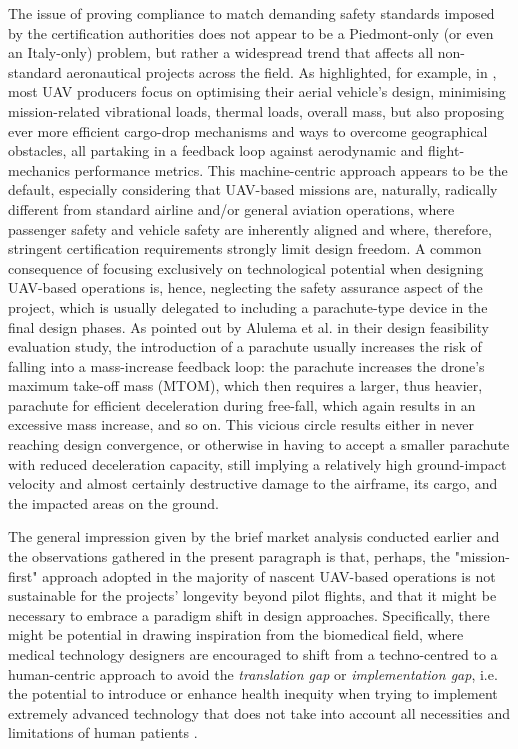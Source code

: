 The issue of proving compliance to match demanding safety standards imposed by the certification authorities does not appear to be a Piedmont-only (or even an Italy-only) problem, but rather a widespread trend that affects all non-standard aeronautical projects across the field. As highlighted, for example, in \cite{chhetri2026survey}, most UAV producers focus on optimising their aerial vehicle's design, minimising mission-related vibrational loads, thermal loads, overall mass, but also proposing ever more efficient cargo-drop mechanisms and ways to overcome geographical obstacles, all partaking in a feedback loop against aerodynamic and flight-mechanics performance metrics. This machine-centric approach appears to be the default, especially considering that UAV-based missions are, naturally, radically different from standard airline and/or general aviation operations, where passenger safety and vehicle safety are inherently aligned and where, therefore, stringent certification requirements strongly limit design freedom. A common consequence of focusing exclusively on technological potential when designing UAV-based operations is, hence, neglecting the safety assurance aspect of the project, which is usually delegated to including a parachute-type device in the final design phases. As pointed out by Alulema et al. \cite{alulema2026how} in their design feasibility evaluation study, the introduction of a parachute usually increases the risk of falling into a mass-increase feedback loop: the parachute increases the drone's maximum take-off mass (MTOM), which then requires a larger, thus heavier, parachute for efficient deceleration during free-fall, which again results in an excessive mass increase, and so on. This vicious circle results either in never reaching design convergence, or otherwise in having to accept a smaller parachute with reduced deceleration capacity, still implying a relatively high ground-impact velocity and almost certainly destructive damage to the airframe, its cargo, and the impacted areas on the ground.     

The general impression given by the brief market analysis conducted earlier and the observations gathered in the present paragraph is that, perhaps, the "mission-first" approach adopted in the majority of nascent UAV-based operations is not sustainable for the projects' longevity beyond pilot flights, and that it might be necessary to embrace a paradigm shift in design approaches. Specifically, there might be potential in drawing inspiration from the biomedical field, where medical technology designers are encouraged to shift from a techno-centred to a human-centric approach to avoid the \textit{translation gap} or \textit{implementation gap}, i.e. the potential to introduce or enhance health inequity when trying to implement extremely advanced technology that does not take into account all necessities and limitations of human patients \cite{rodriguez2023thinking}. 

